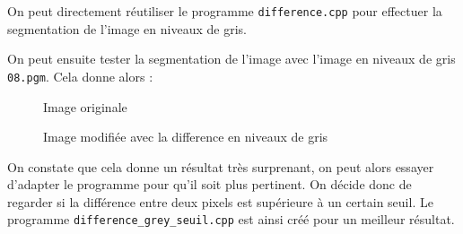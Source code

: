\documentclass[french,a4paper,10pt]{article}
\begin{document}
	On peut directement réutiliser le programme \texttt{difference.cpp} pour effectuer la segmentation de l'image en
	niveaux de gris.

	On peut ensuite tester la segmentation de l'image avec l'image en niveaux de gris \texttt{08.pgm}.
	Cela donne alors :
	\begin{figure}[!htb]
		\begin{minipage}{0.48\textwidth}
			\centering
			\caption{Image originale}\label{Fig:orig-08-8}
		\end{minipage}\hfill
		\begin{minipage}{0.48\textwidth}
			\centering
			\caption{Image modifiée avec la difference en niveaux de gris}\label{Fig:segmentation-grey-08}
		\end{minipage}
	\end{figure}

	On constate que cela donne un résultat très surprenant, on peut alors essayer d'adapter le programme pour qu'il
	soit plus pertinent.
	On décide donc de regarder si la différence entre deux pixels est supérieure à un certain seuil.
	Le programme \texttt{difference\_grey\_seuil.cpp} est ainsi créé pour un meilleur résultat.
\end{document}
